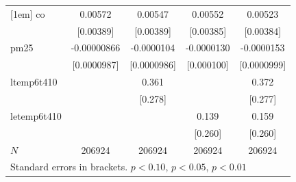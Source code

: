 \documentclass[11pt]{article}
\begin{document}
\begin{center}
{\begin{tabular}{l*{4}{c}}
				[1em]
				co          &     0.00572         &     0.00547         &     0.00552         &     0.00523         \\
				&   [0.00389]         &   [0.00389]         &   [0.00385]         &   [0.00384]         \\
				[1em]
				pm25        & -0.00000866         &  -0.0000104         &  -0.0000130         &  -0.0000153         \\
				& [0.0000987]         & [0.0000986]         &  [0.000100]         & [0.0000999]         \\
				[1em]
				ltemp6t410  &                     &       0.361         &                     &       0.372         \\
				&                     &     [0.278]         &                     &     [0.277]         \\
				[1em]
				letemp6t410 &                     &                     &       0.139         &       0.159         \\
				&                     &                     &     [0.260]         &     [0.260]         \\
				\hline
				\(N\)       &      206924         &      206924         &      206924         &      206924         \\
				\hline\hline
				\multicolumn{5}{l}{\footnotesize Standard errors in brackets. \sym{*} \(p<0.10\), \sym{**} \(p<0.05\), \sym{***} \(p<0.01\)}\\
			\end{tabular}
		}
	\end{center}
\end{document}
